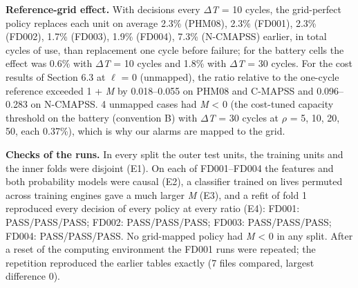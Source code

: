 \documentclass[11pt,a4paper]{article}
\begin{document}
\noindent \textbf{Reference-grid effect.} With decisions every $\Delta$\textit{T} = 10 cycles, the grid-perfect policy replaces each unit on average 2.3\% (PHM08), 2.3\% (FD001), 2.3\% (FD002), 1.7\% (FD003), 1.9\% (FD004), 7.3\% (N-CMAPSS) earlier, in total cycles of use, than replacement one cycle before failure; for the battery cells the effect was 0.6\% with $\Delta$\textit{T} = 10 cycles and 1.8\% with $\Delta$\textit{T} = 30 cycles. For the cost results of Section 6.3 at $\ell$ = 0 (unmapped), the ratio relative to the one-cycle reference exceeded 1 + \textit{M} by 0.018--0.055 on PHM08 and C-MAPSS and 0.096--0.283 on N-CMAPSS. 4 unmapped cases had \textit{M} < 0 (the cost-tuned capacity threshold on the battery (convention B) with $\Delta$\textit{T} = 30 cycles at $\rho$ = 5, 10, 20, 50, each \textminus{}0.37\%), which is why our alarms are mapped to the grid.

\noindent \textbf{Checks of the runs.} In every split the outer test units, the training units and the inner folds were disjoint (E1). On each of FD001--FD004 the features and both probability models were causal (E2), a classifier trained on lives permuted across training engines gave a much larger \textit{M} (E3), and a refit of fold 1 reproduced every decision of every policy at every ratio (E4): FD001: PASS/PASS/PASS; FD002: PASS/PASS/PASS; FD003: PASS/PASS/PASS; FD004: PASS/PASS/PASS. No grid-mapped policy had \textit{M} < 0 in any split. After a reset of the computing environment the FD001 runs were repeated; the repetition reproduced the earlier tables exactly (7 files compared, largest difference 0).
\end{document}
